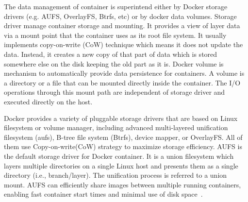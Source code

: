 The data management of container is superintend either by Docker storage drivers (e.g. AUFS, OverlayFS, Btrfs, etc) or by docker data volumes. Storage driver manage container storage and mounting. It provides a view of layer data via a mount point that the container uses as its root file system. It usually implements copy-on-write (CoW) technique which means it does not update the data. Instead, it creates a new copy of that part of data which is stored somewhere else on the disk keeping the old part as it is. Docker volume is mechanism to automatically provide data persistence for containers. A volume is a directory or a file that can be mounted directly inside the container. The I/O operations through this mount path are independent of storage driver and executed directly on the host. 

Docker provides a variety of pluggable storage drivers that are based on Linux filesystem or volume manager, including advanced multi-layered unification filesystem (aufs), B-tree file system (Btrfs), device mapper, or OverlayFS. All of them use Copy-on-write(CoW) strategy to maximize storage efficiency. AUFS is the default storage driver for Docker container. It is a union filesystem which layers multiple directories on a single Linux host and presents them as a single directory (i.e., branch/layer). The unification process is referred to a union mount. AUFS can efficiently share images between multiple running containers, enabling fast container start times and minimal use of disk space~\cite{xxx}. 





